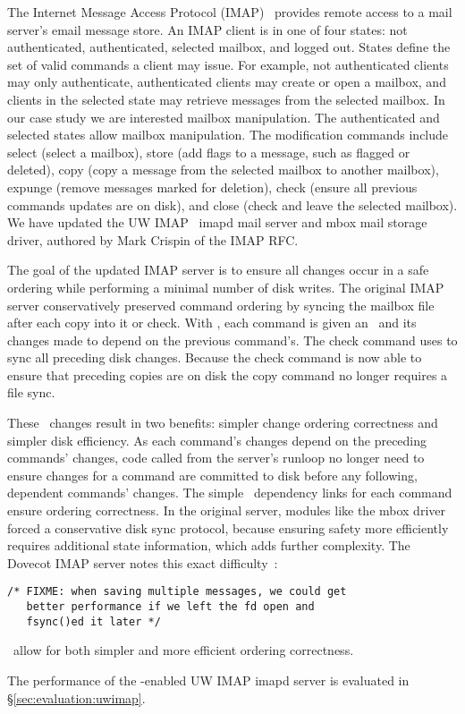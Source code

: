 The Internet Message Access Protocol (IMAP)~\cite{rfc3501} provides
remote access to a mail server's email message store. An IMAP client
is in one of four states: not authenticated, authenticated, selected
mailbox, and logged out. States define the set of valid commands a
client may issue. For example, not authenticated clients may only
authenticate, authenticated clients may create or open a mailbox, and
clients in the selected state may retrieve messages from the selected
mailbox. In our case study we are interested mailbox manipulation. The
authenticated and selected states allow mailbox manipulation. The
modification commands include select (select a mailbox), store (add
flags to a message, such as flagged or deleted), copy (copy a message
from the selected mailbox to another mailbox), expunge (remove
messages marked for deletion), check (ensure all previous commands
updates are on disk), and close (check and leave the selected
mailbox). We have updated the UW IMAP~\cite{uwimap} imapd mail server
and mbox mail storage driver, authored by Mark Crispin of the IMAP RFC.

The goal of the updated IMAP server is to ensure all changes occur in
a safe ordering while performing a minimal number of disk writes.  The
original IMAP server conservatively preserved command ordering by
syncing the mailbox file after each copy into it or check. With
\opgroups, each command is given an \opgroup\ and its changes made to
depend on the previous command's. The check command uses \opgroupSync
to sync all preceding disk changes. Because the check command is now
able to ensure that preceding copies are on disk the copy command no
longer requires a file sync.

These \opgroup\ changes result in two benefits: simpler change
ordering correctness and simpler disk efficiency. As each command's
changes depend on the preceding commands' changes, code called from
the server's runloop no longer need to ensure changes for a command
are committed to disk before any following, dependent commands'
changes. The simple \opgroup\ dependency links for each command ensure
ordering correctness. In the original server, modules like the mbox
driver forced a conservative disk sync protocol, because ensuring
safety more efficiently requires additional state information, which adds
further complexity. The Dovecot IMAP server notes this exact
difficulty~\cite[maildir-save.c]{dovecot}:

\vspace{-0.5\baselineskip}
\begin{scriptsize}
\begin{verbatim}
/* FIXME: when saving multiple messages, we could get
   better performance if we left the fd open and
   fsync()ed it later */
\end{verbatim}
\end{scriptsize}

\vspace{-0.5\baselineskip}
\noindent \Opgroups\ allow for both simpler and more efficient ordering correctness.

The performance of the \opgroup{}-enabled UW IMAP imapd server is
evaluated in \S\ref{sec:evaluation:uwimap}.
